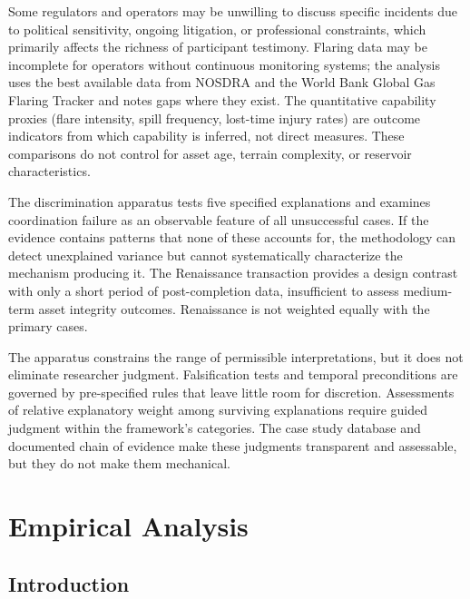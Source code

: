 \documentclass[twoside,fontset=lmodern]{mitthesis}
\begin{document}
Some regulators and operators may be unwilling to discuss specific
incidents due to political sensitivity, ongoing litigation, or
professional constraints, which primarily affects the richness of
participant testimony. Flaring data may be incomplete for operators
without continuous monitoring systems; the analysis uses the best
available data from NOSDRA and the World Bank Global Gas Flaring Tracker
and notes gaps where they exist. The quantitative capability proxies
(flare intensity, spill frequency, lost-time injury rates) are outcome
indicators from which capability is inferred, not direct measures. These
comparisons do not control for asset age, terrain complexity, or
reservoir characteristics.

The discrimination apparatus tests five specified explanations and
examines coordination failure as an observable feature of all
unsuccessful cases. If the evidence contains patterns that none of these
accounts for, the methodology can detect unexplained variance but cannot
systematically characterize the mechanism producing it. The Renaissance
transaction provides a design contrast with only a short period of
post-completion data, insufficient to assess medium-term asset integrity
outcomes. Renaissance is not weighted equally with the primary cases.

The apparatus constrains the range of permissible interpretations, but
it does not eliminate researcher judgment. Falsification tests and
temporal preconditions are governed by pre-specified rules that leave
little room for discretion. Assessments of relative explanatory weight
among surviving explanations require guided judgment within the
framework's categories. The case study database and documented chain of
evidence make these judgments transparent and assessable, but they do
not make them mechanical.


\hypertarget{empirical-analysis}{%
\chapter{Empirical Analysis}\label{empirical-analysis}}

\hypertarget{introduction}{%
\section{Introduction}\label{introduction}}
\end{document}
